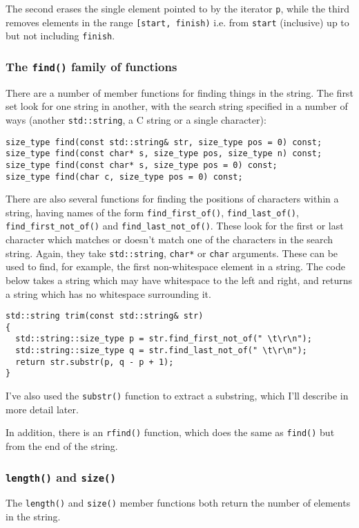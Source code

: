 \documentclass[a4paper]{scrartcl}
\begin{document}
The second erases the single element pointed to by the iterator \texttt{p}, while the third removes elements in the range \texttt{[start, finish)} i.e. from \texttt{start} (inclusive) up to but not including \texttt{finish}.

\subsubsection{The \texttt{find()} family of functions}
There are a number of member functions for finding things in the string. The first set look for one string in another, with the search string specified in a number of ways (another \texttt{std::string}, a C string or a single character):
\begin{verbatim}
size_type find(const std::string& str, size_type pos = 0) const;
size_type find(const char* s, size_type pos, size_type n) const;
size_type find(const char* s, size_type pos = 0) const;
size_type find(char c, size_type pos = 0) const;
\end{verbatim}

There are also several functions for finding the positions of characters within a string, having names of the form \texttt{find\_first\_of()}, \texttt{find\_last\_of()}, \texttt{find\_first\_not\_of()} and \texttt{find\_last\_not\_of()}. These look for the first or last character which matches or doesn't match one of the characters in the search string. Again, they take \texttt{std::string}, \texttt{char*} or \texttt{char} arguments. These can be used to find, for example, the first non-whitespace element in a string. The code below takes a string which may have whitespace to the left and right, and returns a string which has no whitespace surrounding it.
\begin{verbatim}
std::string trim(const std::string& str)
{
  std::string::size_type p = str.find_first_not_of(" \t\r\n");
  std::string::size_type q = str.find_last_not_of(" \t\r\n");
  return str.substr(p, q - p + 1);
}
\end{verbatim}
I've also used the \texttt{substr()} function to extract a substring, which I'll describe in more detail later.

In addition, there is an \texttt{rfind()} function, which does the same as \texttt{find()} but from the end of the string.

\subsubsection{\texttt{length()} and \texttt{size()}}
The \texttt{length()} and \texttt{size()} member functions both return the number of elements in the string.
\end{document}
